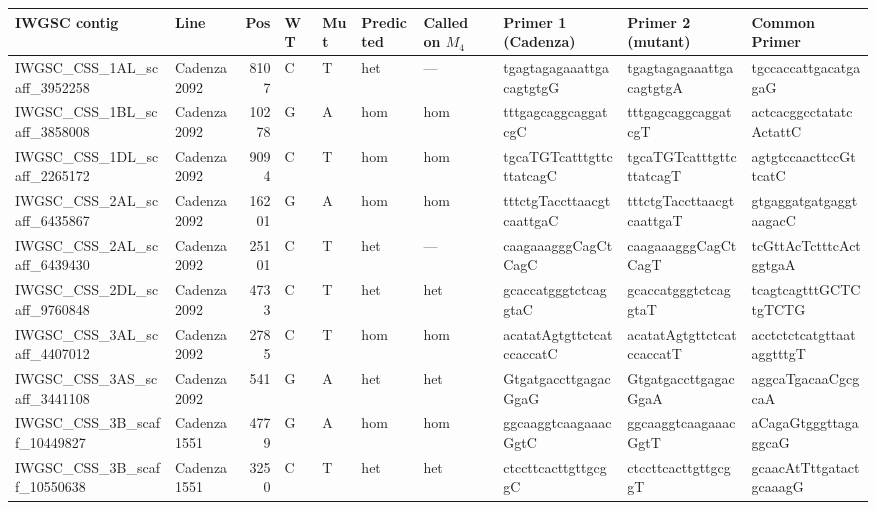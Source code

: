 \begin{tabular}{llrlllllll}
\toprule
IWGSC contig                 & Line       &   Pos & WT   & Mut   & Predicted   & Called on $M_{4}$     & Primer 1 (Cadenza)        & Primer 2 (mutant)         & Common Primer             \\
\midrule
 IWGSC\_CSS\_1AL\_scaff\_3952258  & Cadenza2092 &       8107 & C         & T        & het            & ---         & tgagtagagaaattgacagtgtgG  & tgagtagagaaattgacagtgtgA  & tgccaccattgacatgagaG      \\
 IWGSC\_CSS\_1BL\_scaff\_3858008  & Cadenza2092 &      10278 & G         & A        & hom            & hom         & tttgagcaggcaggatcgC       & tttgagcaggcaggatcgT       & actcacggcctatatcActattC   \\
 IWGSC\_CSS\_1DL\_scaff\_2265172  & Cadenza2092 &       9094 & C         & T        & hom            & hom         & tgcaTGTcatttgttcttatcagC  & tgcaTGTcatttgttcttatcagT  & agtgtccaacttccGttcatC     \\
 IWGSC\_CSS\_2AL\_scaff\_6435867  & Cadenza2092 &      16201 & G         & A        & hom            & hom         & tttctgTaccttaacgtcaattgaC & tttctgTaccttaacgtcaattgaT & gtgaggatgatgaggtaagacC    \\
 IWGSC\_CSS\_2AL\_scaff\_6439430  & Cadenza2092 &      25101 & C         & T        & het            & ---         & caagaaagggCagCtCagC       & caagaaagggCagCtCagT       & tcGttAcTctttcActggtgaA    \\
 IWGSC\_CSS\_2DL\_scaff\_9760848  & Cadenza2092 &       4733 & C         & T        & het            & het         & gcaccatgggtctcaggtaC      & gcaccatgggtctcaggtaT      & tcagtcagtttGCTCtgTCTG     \\
 IWGSC\_CSS\_3AL\_scaff\_4407012  & Cadenza2092 &       2785 & C         & T        & hom            & hom         & acatatAgtgttctcatccaccatC & acatatAgtgttctcatccaccatT & acctctctcatgttaataggtttgT \\
 IWGSC\_CSS\_3AS\_scaff\_3441108  & Cadenza2092 &        541 & G         & A        & het            & het         & GtgatgaccttgagacGgaG      & GtgatgaccttgagacGgaA      & aggcaTgacaaCgcgcaA        \\
 IWGSC\_CSS\_3B\_scaff\_10449827  & Cadenza1551 &       4779 & G         & A        & hom            & hom         & ggcaaggtcaagaaacGgtC      & ggcaaggtcaagaaacGgtT      & aCagaGtgggttagaggcaG      \\
 IWGSC\_CSS\_3B\_scaff\_10550638  & Cadenza1551 &       3250 & C         & T        & het            & het         & ctccttcacttgttgcggC       & ctccttcacttgttgcggT       & gcaacAtTttgatactgcaaagG   \\

\end{tabular}
